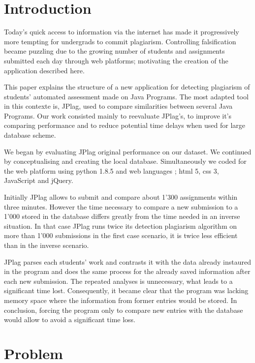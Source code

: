 \documentclass[twoside]{article}
\begin{document}
\begin{multicols*}{2} %

\section{Introduction}
Today's quick access to information via the internet has made it progressively more tempting for undergrads to commit plagiarism. Controlling falsification became puzzling due to the growing number of students and assignments submitted each day through web platforms; motivating the creation of the application described here.

This paper explains the structure of a new application for detecting plagiarism of students' automated assessment made on Java Programs. The most adapted tool in this contexte is, JPlag, used to compare similarities between several Java Programs. Our work consisted mainly to reevaluate JPlag's, to improve it's comparing performance and to reduce potential time delays when used for large database scheme.

We began by evaluating JPlag original performance on our dataset. We continued by conceptualising and creating the local database. Simultaneously we coded for the web platform using python 1.8.5 and web languages ; html 5, css 3, JavaScript and jQuery.  

Initially JPlag allows to submit and compare about 1'300 assignments within three minutes. However the time necessary to compare a new submission to a 1'000 stored in the database differs greatly from the time needed in an inverse situation. In that case JPlag runs twice its detection plagiarism algorithm on more than 1'000 submissions in the first case scenario, it is twice less efficient than in the inverse scenario. 

JPlag parses each students' work and contrasts it with the data already instaured in the program and does the same process for the already saved information after each new submission. The repeated analyses is unnecessary, what leads to a significant time lost. Consequently, it became clear that the program was lacking memory space where the information from former entries would be stored. In conclusion, forcing the program only to compare new entries with the database would allow to avoid a significant time loss.

\newpage
\section{Problem}


\end{multicols*}
\end{document}
